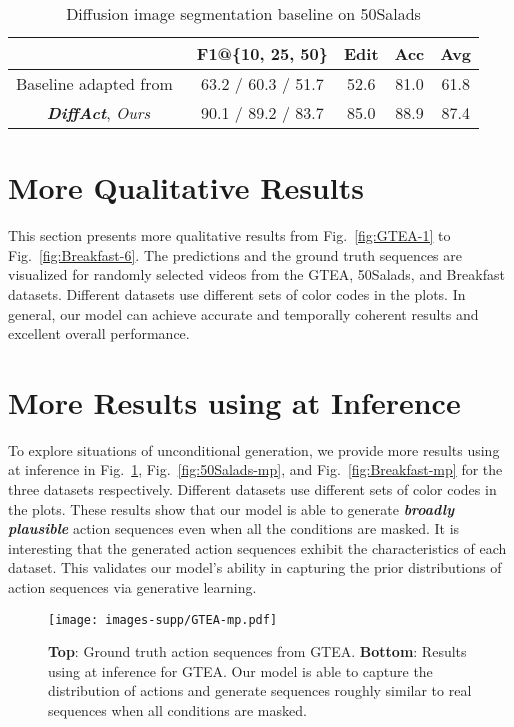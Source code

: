 \documentclass[10pt,twocolumn,letterpaper]{article}
\begin{document}
\begin{table}[t]
\begin{center}
\scriptsize
\begin{tabular}{c | c c c c c c }
\hline
  & \multicolumn{3}{c}{F1@\{10, 25, 50\}} & Edit & Acc & Avg \\
\hline
Baseline adapted from~\cite{SegDiff,MedSegDiff} & \multicolumn{3}{c}{ 63.2 / 60.3 / 51.7 } & 52.6 & 81.0 & 61.8 \\
\textbf{\textit{DiffAct}}, \textit{Ours} & \multicolumn{3}{c}{ 90.1 / 89.2 / 83.7} & 85.0 & 88.9 & 87.4 \\
\hline
\end{tabular}
\end{center}
\caption{Diffusion image segmentation baseline on 50Salads}
\label{table:image-baseline}
\end{table}


\section{More Qualitative Results}

This section presents more qualitative results from Fig.~\ref{fig:GTEA-1} to Fig.~\ref{fig:Breakfast-6}.
The predictions and the ground truth sequences are visualized for randomly selected videos from the GTEA, 50Salads, and Breakfast datasets.
Different datasets use different sets of color codes in the plots.
In general, our model can achieve accurate and temporally coherent results and excellent overall performance.

\section{More Results using  at Inference}

To explore situations of unconditional generation, we provide more results using  at inference in Fig.~\ref{fig:GTEA-mp}, Fig.~\ref{fig:50Salads-mp}, and Fig.~\ref{fig:Breakfast-mp} for the three datasets respectively. 
Different datasets use different sets of color codes in the plots.
These results show that our model is able to generate \textbf{\textit{broadly plausible}} action sequences even when all the conditions are masked.
It is interesting that the generated action sequences exhibit the characteristics of each dataset.
This validates our model's ability in capturing the prior distributions of action sequences via generative learning.


\begin{figure}[t]
\vspace{-2.5cm}
\begin{center}
   \texttt{[image: images-supp/GTEA-mp.pdf]}
\end{center}
   \caption{\textbf{Top}: Ground truth action sequences from GTEA. \textbf{Bottom}: Results using  at inference for GTEA. Our model is able to capture the distribution of actions and generate sequences roughly similar to real sequences when all conditions are masked.}
\label{fig:GTEA-mp}
\end{figure}
\end{document}
